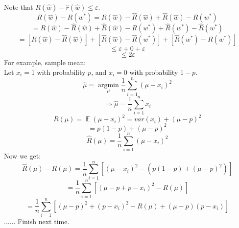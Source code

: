 \documentclass[twoside]{article}
\theoremstyle{definition}
\theoremstyle{definition}
\theoremstyle{remark}
\def\E{{\mathbb E}}
\begin{document}
Note that $R(\hat w) - \hat r(\hat w) \leq \varepsilon$.\\
\[R(\hat w)-R(w^*) = R(\hat w) - \hat R (\hat w)+\hat R (\hat w) - R(w^*)\]
\[=R(\hat w) - \hat R(\hat w) + \hat R(\hat w) - R(w^*)+ \hat R(w^*)-\hat R(w^*)\]
\[=[R(\hat w) - \hat R(\hat w)]+[\hat R(\hat w) - \hat R (w^*)]+[\hat R(w^*) - R(w^*)]\]
\[\leq \varepsilon + 0 + \varepsilon\]
\[\leq 2 \varepsilon\]
For example, sample mean:\\
Let $x_i = 1$ with probability $p$, and $x_i = 0$ with probability $1-p$. 
\[\hat \mu = \underset{\mu}{\operatorname{argmin}} \frac{1}{n} \sum_{i=1}^n (\mu - x_i)^2 \]
\[\Rightarrow \hat \mu = \frac{1}{n} \sum_{i=1}^n x_i\]
\[R(\mu) = \;\E\; (\mu - x_i)^2 = var(x_i) + (\mu - p)^2\]
\[=p(1-p)+(\mu-p)^2\]
\[\hat R(\mu) = \frac{1}{n} \sum_{i=1}^n (\mu - x_i)^2 \]
Now we get:\\
\[\hat R(\mu) - R(\mu) = \frac{1}{n} \sum_{i=1}^n [(\mu - x_i)^2 - (p(1-p)+(\mu-p)^2)]\]
\[=\frac{1}{n} \sum_{i=1}^n[(\mu - p + p -x_i)^2 - R(\mu)]\]
\[=\frac{1}{n} \sum_{i=1}^n[(\mu-p)^2 + (p-x_i)^2 - R(\mu) + (\mu-p)(p-x_i)]\]
...... Finish next time.\\
\end{document}
